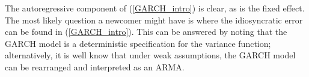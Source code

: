 \documentclass{uiucthesis2021}
\newcommand{\x}{\textbf{v}}
\newcommand{\simiid}{\stackrel{iid}{\sim}} %
\newcommand{\indep}{\perp \!\!\! \perp } %
\def\mrm#1{\mathrm{#1}} %
\def\mc#1{\mathcal{#1}} %
\def\mc#1{\mathcal{#1}}
\theoremstyle{definition}
\begin{document}
    The autoregressive component of (\ref{GARCH_intro}) is clear, as is the fixed effect.  The most likely question a newcomer might have is where the idiosyncratic error can be found in (\ref{GARCH_intro}).  This can be answered by noting that the GARCH model is a deterministic specification for the variance function; alternatively, it is well know that under weak assumptions, the GARCH model can be rearranged and interpreted as an ARMA.
  
    
  
\end{document}

